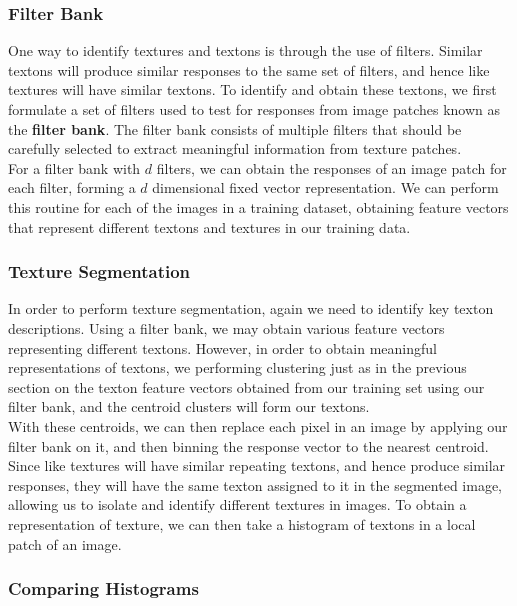 \documentclass[12pt]{article}
\begin{document}
\subsubsection{Filter Bank}

One way to identify textures and textons is through the use of filters. Similar textons will produce similar responses to the same set of filters, and hence like textures will have similar textons. To identify and obtain these textons, we first formulate a set of filters used to test for responses from image patches known as the \textbf{filter bank}. The filter bank consists of multiple filters that should be carefully selected to extract meaningful information from texture patches. \\

For a filter bank with $d$ filters, we can obtain the responses of an image patch for each filter, forming a $d$ dimensional fixed vector representation. We can perform this routine for each of the images in a training dataset, obtaining feature vectors that represent different textons and textures in our training data.\\ 

\subsubsection{Texture Segmentation}
In order to perform texture segmentation, again we need to identify key texton descriptions. Using a filter bank, we may obtain various feature vectors representing different textons. However, in order to obtain meaningful representations of textons, we performing clustering just as in the previous section on the texton feature vectors obtained from our training set using our filter bank, and the centroid clusters will form our textons.\\

With these centroids, we can then replace each pixel in an image by applying our filter bank on it, and then binning the response vector to the nearest centroid. Since like textures will have similar repeating textons, and hence produce similar responses, they will have the same texton assigned to it in the segmented image, allowing us to isolate and identify different textures in images. To obtain a representation of texture, we can then take a histogram of textons in a local patch of an image.

\subsubsection{Comparing Histograms}
\end{document}
